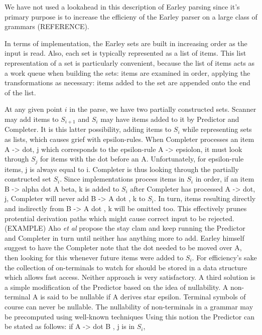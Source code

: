 \begin{isabellebody}
\begin{isamarkuptext}
We have not used a lookahead in this description of Earley parsing since it's primary purpose is to
increase the efficieny of the Earley parser on a large class of grammars (REFERENCE).

In terms of implementation, the Earley sets are built in increasing order as the input is read. Also,
each set is typically represented as a list of items. This list representation of a set is particularly
convenient, because the list of items acts as a work queue when building the sets: items are examined
in order, applying the transformations as necessary: items added to the set are appended onto the end of
the list.

At any given point $i$ in the parse, we have two partially constructed sets. Scanner may add items to
$S_{i+1}$ and $S_i$ may have items added to it by Predictor and Completer. It is this latter possibility,
adding items to $S_i$ while representing sets as lists, which causes grief with epsilon-rules.
When Completer processes an item A -> dot, j which corresponds to the epsilon-rule A -> epsiolon, it must
look through $S_j$ for items with the dot before an A. Unfortunately, for epsilon-rule items, j is always
equal to i. Completer is thus looking through the partially constructed set $S_i$. Since implementations
process items in $S_i$ in order, if an item B -> alpha dot A beta, k is added to $S_i$ after Completer
has processed A -> dot, j, Completer will never add B -> \alpha A dot \beta, k to $S_i$. In turn, items
resulting directly and indirectly from B -> \alpha A dot \beta, k will be omitted too. This effectively
prunes protential derivation paths which might cause correct input to be rejected. (EXAMPLE)
Aho \textit{et al} \cite{Aho:1972} propose the stay clam and keep running the Predictor and Completer
in turn until neither has anything more to add. Earley himself suggest to have the Completer note that
the dot needed to be moved over A, then looking for this whenever future items were added to $S_i$.
For efficiency's sake the collection of on-terminals to watch for should be stored in a data structure
which allows fast access. Neither approach is very satisfactory. A third solution \cite{Aycoack:2002}
is a simple modification of the Predictor based on the idea of nullability. A non-terminal A is said to be
nullable if A derives star epsilon. Terminal symbols of course can never be nullable. The nullability of
non-terminals in a grammar may be precomputed using well-known techniques \cite{Appel:2003} \cite{Fischer:2009}
Using this notion the Predictor can be stated as follows: if A -> \alpha dot B \beta, j is in $S_i$,

\end{isamarkuptext}
\end{isabellebody}
